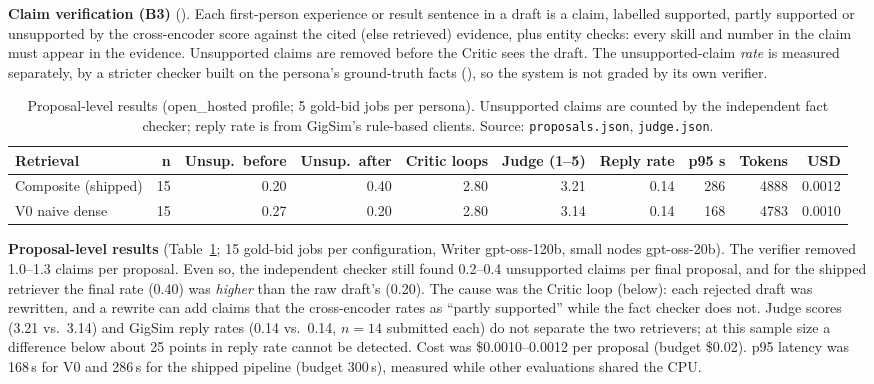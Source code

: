 \documentclass[10pt,a4paper]{article}
\newcommand{\file}[1]{\texttt{\detokenize{#1}}}
\begin{document}
\textbf{Claim verification (B3)} (\file{rag/verify.py}). Each first-person experience or result sentence in a draft is a claim,
labelled supported, partly supported or unsupported by the cross-encoder score against the cited (else retrieved) evidence, plus
entity checks: every skill and number in the claim must appear in the evidence. Unsupported claims are removed before the Critic
sees the draft. The unsupported-claim \emph{rate} is measured separately, by a stricter checker built on the persona's
ground-truth facts (\file{evals/checkers/fact_check.py}), so the system is not graded by its own verifier.

\begin{table}[t]\centering\small\caption{Proposal-level results (open\_hosted profile; 5 gold-bid jobs per persona). Unsupported claims are counted by the independent fact checker; reply rate is from GigSim's rule-based clients. Source: \texttt{proposals.json}, \texttt{judge.json}.}\label{tab:prop}
\begin{tabular}{lrrrrrrrrr}\toprule Retrieval & n & Unsup.\ before & Unsup.\ after & Critic loops & Judge (1--5) & Reply rate & p95 s & Tokens & USD\\\midrule
Composite (shipped) & 15 & 0.20 & 0.40 & 2.80 & 3.21 & 0.14 & 286 & 4888 & 0.0012 \\
V0 naive dense & 15 & 0.27 & 0.20 & 2.80 & 3.14 & 0.14 & 168 & 4783 & 0.0010 \\
\bottomrule\end{tabular}\end{table}

\textbf{Proposal-level results} (Table~\ref{tab:prop}; 15 gold-bid jobs per configuration, Writer gpt-oss-120b, small nodes
gpt-oss-20b). The verifier removed 1.0--1.3 claims per proposal. Even so, the independent checker still found 0.2--0.4
unsupported claims per final proposal, and for the shipped retriever the final rate (0.40) was \emph{higher} than the raw draft's
(0.20). The cause was the Critic loop (below): each rejected draft was rewritten, and a rewrite can add claims that the
cross-encoder rates as ``partly supported'' while the fact checker does not. Judge scores (3.21 vs.\ 3.14) and GigSim reply
rates (0.14 vs.\ 0.14, $n=14$ submitted each) do not separate the two retrievers; at this sample size a difference below about
25 points in reply rate cannot be detected. Cost was \$0.0010--0.0012 per proposal (budget \$0.02). p95 latency was 168\,s for V0
and 286\,s for the shipped pipeline (budget 300\,s), measured while other evaluations shared the CPU.
\end{document}
